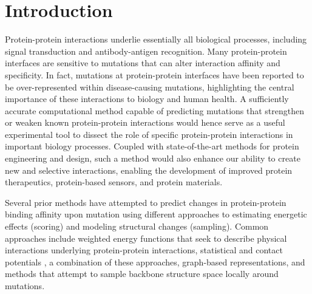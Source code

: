 \section{Introduction}

Protein-protein interactions underlie essentially all biological processes, including signal transduction and antibody-antigen recognition. Many protein-protein interfaces are sensitive to mutations that can alter interaction affinity and specificity.
In fact, mutations at protein-protein interfaces have been reported to be over-represented within disease-causing mutations\cite{jubb_mutations_2017}, highlighting the central importance of these interactions to biology and human health.
A sufficiently accurate computational method capable of predicting mutations that strengthen or weaken known protein-protein interactions would hence serve as a useful experimental tool to dissect the role of specific protein-protein interactions in important biology processes. Coupled with state-of-the-art methods for protein engineering and design, such a method would also enhance our ability to create new and selective interactions, enabling the development of improved protein therapeutics, protein-based sensors, and protein materials.

Several prior methods have attempted to predict changes in protein-protein binding affinity upon mutation using different approaches to estimating energetic effects (scoring) and modeling structural changes (sampling). Common approaches include
weighted energy functions that seek to describe physical interactions underlying protein-protein interactions\cite{guerois_predicting_2002,kamisetty_accounting_2011},
statistical and contact potentials \cite{dehouck_beatmusic:_2013,moal_intermolecular_2013,vangone_contacts-based_2015,brender_predicting_2015},
a combination of these approaches\cite{li_predicting_2014},
graph-based representations\cite{pires_mcsm:_2014},
and methods that attempt to sample backbone structure space locally around mutations\cite{dourado_multiscale_2014}.

